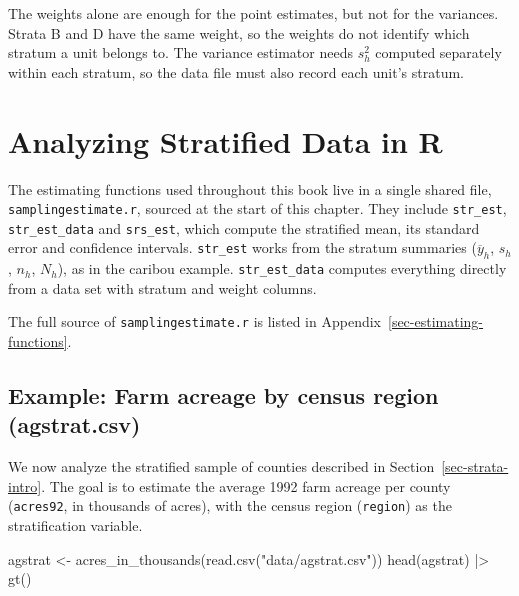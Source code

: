 \documentclass[
  letterpaper,
  DIV=11,
  numbers=noendperiod]{scrreprt}
\newenvironment{Shaded}{\begin{snugshade}}{\end{snugshade}}
\newcommand{\FunctionTok}[1]{\textcolor[rgb]{0.28,0.35,0.67}{#1}}
\newcommand{\NormalTok}[1]{\textcolor[rgb]{0.00,0.23,0.31}{#1}}
\newcommand{\OtherTok}[1]{\textcolor[rgb]{0.00,0.23,0.31}{#1}}
\newcommand{\SpecialCharTok}[1]{\textcolor[rgb]{0.37,0.37,0.37}{#1}}
\newcommand{\StringTok}[1]{\textcolor[rgb]{0.13,0.47,0.30}{#1}}
\renewcommand{\[}{\begin{equation}}
\renewcommand{\]}{\end{equation}}
\begin{document}
The weights alone are enough for the point estimates, but not for the
variances. Strata B and D have the same weight, so the weights do not
identify which stratum a unit belongs to. The variance estimator needs
\(s_h^2\) computed separately within each stratum, so the data file must
also record each unit's stratum.

\section{Analyzing Stratified Data in R}\label{sec-strata-functions}

The estimating functions used throughout this book live in a single
shared file, \texttt{samplingestimate.r}, sourced at the start of this
chapter. They include \texttt{str\_est}, \texttt{str\_est\_data} and
\texttt{srs\_est}, which compute the stratified mean, its standard error
and confidence intervals. \texttt{str\_est} works from the stratum
summaries (\(\overline y_h\), \(s_h\), \(n_h\), \(N_h\)), as in the
caribou example. \texttt{str\_est\_data} computes everything directly
from a data set with stratum and weight columns.

The full source of \texttt{samplingestimate.r} is listed in
Appendix~\ref{sec-estimating-functions}.

\subsection{Example: Farm acreage by census region
(agstrat.csv)}\label{sec-strata-agstrat}

We now analyze the stratified sample of counties described in
Section~\ref{sec-strata-intro}. The goal is to estimate the average 1992
farm acreage per county (\texttt{acres92}, in thousands of acres), with
the census region (\texttt{region}) as the stratification variable.

\begin{Shaded}
\begin{Highlighting}[]
\NormalTok{agstrat }\OtherTok{\textless{}{-}} \FunctionTok{acres\_in\_thousands}\NormalTok{(}\FunctionTok{read.csv}\NormalTok{(}\StringTok{"data/agstrat.csv"}\NormalTok{))}
\FunctionTok{head}\NormalTok{(agstrat) }\SpecialCharTok{|\textgreater{}} \FunctionTok{gt}\NormalTok{()}
\end{Highlighting}
\end{Shaded}
\end{document}
